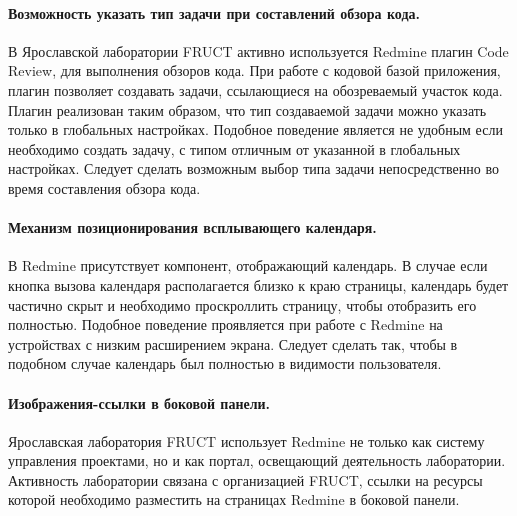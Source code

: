 \paragraph{Возможность указать тип задачи при составлений обзора кода.}
В Ярославской лаборатории FRUCT активно используется Redmine плагин Code
Review, для выполнения обзоров кода. При работе с кодовой базой приложения,
плагин позволяет создавать задачи, ссылающиеся на обозреваемый участок кода.
Плагин реализован таким образом, что тип создаваемой задачи можно указать
только в глобальных настройках. Подобное поведение является не удобным
если необходимо создать задачу, с типом отличным от указанной в глобальных
настройках. Следует сделать возможным выбор типа задачи непосредственно во
время составления обзора кода.


\paragraph{Механизм позиционирования всплывающего календаря.}
В Redmine присутствует компонент, отображающий календарь. В случае если кнопка
вызова календаря располагается близко к краю страницы, календарь
будет частично скрыт и необходимо проскроллить страницу, чтобы отобразить его
полностью. Подобное поведение проявляется при работе с Redmine на устройствах с
низким расширением экрана. Следует сделать так, чтобы в подобном случае
календарь был полностью в видимости пользователя.

\paragraph{Изображения-ссылки в боковой панели.}
Ярославская лаборатория FRUCT использует Redmine не только как систему
управления проектами, но и как портал, освещающий деятельность лаборатории.
Активность лаборатории связана с организацией FRUCT, ссылки на ресурсы которой
необходимо разместить на страницах Redmine в боковой панели.


